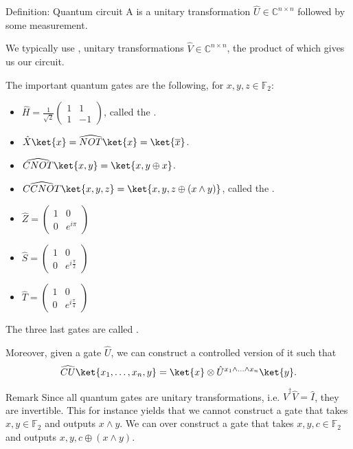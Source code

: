 \documentclass[a4paper]{article}
\begin{document}
\begin{parag}{Definition: Quantum circuit}
    A  is a unitary transformation $\hat{U} \in \mathbb{C}^{n \times n}$ followed by some measurement.

    We typically use , unitary transformations $\hat{V} \in \mathbb{C}^{n \times n}$, the product of which gives us our circuit.

    The important quantum gates are the following, for $x, y, z \in \mathbb{F}_2$:
    \begin{itemize}
        \item $\displaystyle \hat{H} = \frac{1}{\sqrt{2}}\begin{pmatrix} 1 & 1 \\ 1 & -1 \end{pmatrix} $, called the . 
        \item $\displaystyle \hat{X} \ket{x} = \widehat{NOT} \ket{x} = \ket{\bar{x}}$.
        \item $\displaystyle \widehat{CNOT} \ket{x, y} = \ket{x, y \oplus x}$.
        \item $\displaystyle \widehat{CCNOT} \ket{x, y, z} = \ket{x, y, z \oplus \left(x \land y\right)}$, called the .
        \item $\displaystyle \hat{Z} = \begin{pmatrix} 1 & 0 \\ 0 & e^{i \pi} \end{pmatrix} $
        \item $\displaystyle \hat{S} = \begin{pmatrix} 1 & 0 \\ 0 & e^{i \frac{\pi}{2}} \end{pmatrix} $
        \item $\displaystyle \hat{T} = \begin{pmatrix} 1 & 0 \\ 0 & e^{i \frac{\pi}{4}} \end{pmatrix} $
    \end{itemize}

    The three last gates are called .

    Moreover, given a gate $\hat{U}$, we can construct a controlled version of it such that
    \[\widehat{CU} \ket{x_1, \ldots, x_n, y} = \ket{x} \otimes \hat{U}^{x_1 \land \ldots \land x_n} \ket{y}.\]

    \begin{subparag}{Remark}
        Since all quantum gates are unitary transformations, i.e. $\hat{V}^{\dagger} \hat{V} = \hat{I}$, they are invertible. This for instance yields that we cannot construct a gate that takes $x, y \in \mathbb{F}_2$ and outputs $x \land y$. We can over construct a gate that takes $x, y, c \in \mathbb{F}_2$ and outputs $x, y, c \oplus \left(x \land y\right)$.


\end{subparag}
\end{parag}
\end{document}
